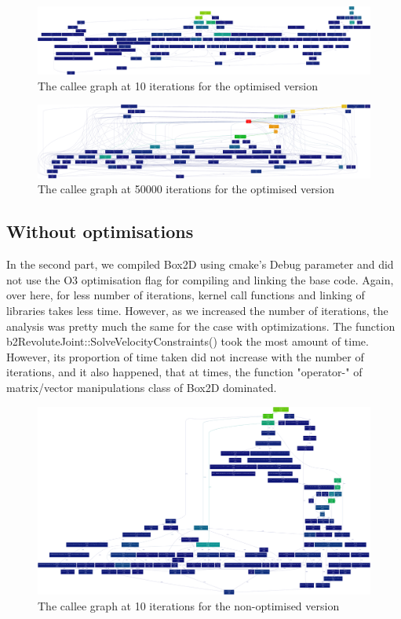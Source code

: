 \documentclass[a4paper,11pt]{article}
\begin{document}
	\begin{figure}[ht]
	\includegraphics[scale=0.05]{release10.png}
	\caption{The callee graph at 10 iterations for the optimised version}
	\end{figure}

	\begin{figure}[ht]
	\includegraphics[scale=0.05]{release50000.png}
	\caption{The callee graph at 50000 iterations for the optimised version}
	\end{figure}

	\subsection{Without optimisations}

	In the second part, we compiled Box2D using cmake's Debug parameter and did not use the O3 optimisation flag for compiling and linking the base code. Again, over here, for less number of iterations, kernel call functions and linking of libraries takes less time. However, as we increased the number of iterations, the analysis was pretty much the same for the case with optimizations. The function 
b2RevoluteJoint::SolveVelocityConstraints() took the most amount of time. However, its proportion of time taken did not increase with the number of iterations, and it also happened, that at times, the function "operator-" of matrix/vector manipulations class of Box2D dominated.

	\begin{figure}[ht]
	\includegraphics[scale=0.08]{debug10.png}
	\caption{The callee graph at 10 iterations for the non-optimised version}
	\end{figure}
\end{document}
